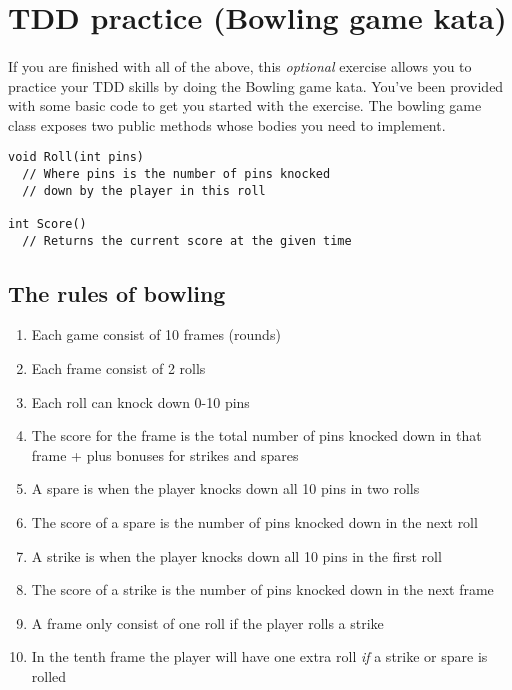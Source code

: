 \documentclass{article}
\begin{document}
\pagebreak
\section{ TDD practice (Bowling game kata)}
  \paragraph{}
  If you are finished with all of the above, this \emph{optional} exercise allows you to practice your TDD skills by doing the Bowling game kata. You've been provided with some basic code to get you started with the exercise. The bowling game class exposes two public methods whose bodies you need to implement.
  
    \begin{lstlisting}
void Roll(int pins)
  // Where pins is the number of pins knocked
  // down by the player in this roll

int Score()
  // Returns the current score at the given time
    \end{lstlisting}

    \subsection*{ The rules of bowling }
      \begin{enumerate}
        \item Each game consist of 10 frames (rounds)
        \item Each frame consist of 2 rolls
        \item Each roll can knock down 0-10 pins
        \item The score for the frame is the total number of pins knocked down in that frame + plus bonuses for strikes and spares
        \item A spare is when the player knocks down all 10 pins in two rolls
        \item The score of a spare is the number of pins knocked down in the next roll
        \item A strike is when the player knocks down all 10 pins in the first roll
        \item The score of a strike is the number of pins knocked down in the next frame
        \item A frame only consist of one roll if the player rolls a strike
        \item In the tenth frame the player will have one extra roll \emph{if} a strike or spare is rolled
      \end{enumerate}
\end{document}
